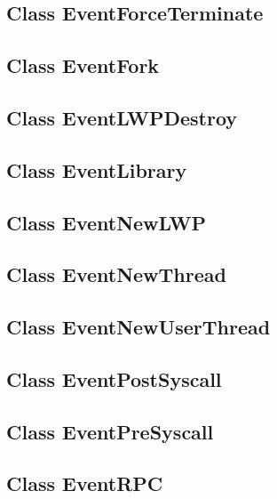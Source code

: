 \documentclass{article}
\begin{document}
  \subsection{Class EventForceTerminate}
    

  \subsection{Class EventFork}
    

  \subsection{Class EventLWPDestroy}
    

  \subsection{Class EventLibrary}
    

  \subsection{Class EventNewLWP}
    

  \subsection{Class EventNewThread}
    

  \subsection{Class EventNewUserThread}
    

  \subsection{Class EventPostSyscall}
    

  \subsection{Class EventPreSyscall}
    

  \subsection{Class EventRPC}
    
\end{document}
